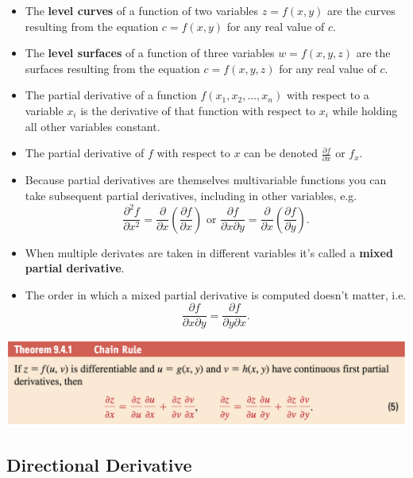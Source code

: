 \documentclass{article}
\begin{document}
\begin{itemize}
  \item The \textbf{level curves} of a function of two variables $z = f(x, y)$ are the curves resulting from the equation $c = f(x, y)$ for any real value of $c$.

  \item The \textbf{level surfaces} of a function of three variables $w = f(x, y, z)$ are the surfaces resulting from the equation $c = f(x, y, z)$ for any real value of $c$.

  \item The partial derivative of a function $f(x_1, x_2, \ldots, x_n)$ with respect to a variable $x_i$ is the derivative of that function with respect to $x_i$ while holding all other variables constant.

  \item The partial derivative of $f$ with respect to $x$ can be denoted $\frac{\partial f}{\partial x}$ or $f_x$.

  \item Because partial derivatives are themselves multivariable functions you can take subsequent partial derivatives, including in other variables, e.g. \[\frac{\partial^2 f}{\partial x^2} = \frac{\partial}{\partial x} \left( \frac{\partial f}{\partial x} \right) \text{ or } \frac{\partial f}{\partial x \partial y} = \frac{\partial}{\partial x} \left( \frac{\partial f}{\partial y} \right).\]

  \item When multiple derivates are taken in different variables it's called a \textbf{mixed partial derivative}.

  \item The order in which a mixed partial derivative is computed doesn't matter, i.e. \[\frac{\partial f}{\partial x \partial y} = \frac{\partial f}{\partial y \partial x}.\]
\end{itemize}

\includegraphics[scale=0.443]{multivariable-chain-rule}

\subsection{Directional Derivative}
\end{document}
